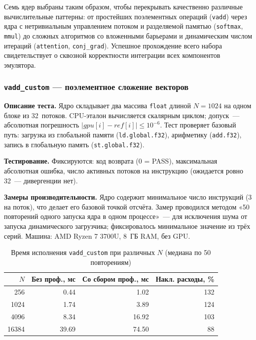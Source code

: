 Семь ядер выбраны таким образом, чтобы перекрывать качественно различные
вычислительные паттерны: от простейших поэлементных операций (\texttt{vadd})
через ядра с нетривиальным управлением потоком и разделяемой памятью
(\texttt{softmax}, \texttt{mmul}) до сложных алгоритмов со вложенными
барьерами и динамическим числом итераций (\texttt{attention}, \texttt{conj\_grad}).
Успешное прохождение всего набора свидетельствует о сквозной корректности
интеграции всех компонентов эмулятора.

\subsubsection{\texttt{vadd\_custom} --- поэлементное сложение векторов}

\textbf{Описание теста.}
Ядро складывает два массива \texttt{float} длиной $N=1024$ на одном
блоке из 32~потоков. CPU-эталон вычисляется скалярным циклом;
допуск~--- абсолютная погрешность $|gpu[i] - ref[i]| \leq 10^{-6}$.
Тест проверяет базовый путь: загрузка из глобальной памяти
(\texttt{ld.global.f32}), арифметику (\texttt{add.f32}),
запись в глобальную память (\texttt{st.global.f32}).

\textbf{Тестирование.}
Фиксируются: код возврата (0 = PASS), максимальная абсолютная
ошибка, число активных потоков на инструкцию
(ожидается ровно 32~--- дивергенции нет).

\textbf{Замеры производительности.}
Ядро содержит минимальное число инструкций (3 на поток),
что делает его базовой точкой отсчёта. Замер проводился
методом «50 повторений одного запуска ядра в одном процессе»~---
для исключения шума от запуска динамического загрузчика;
фиксировалось минимальное значение из трёх серий.
Машина: AMD Ryzen 7 3700U, 8~ГБ RAM, без GPU.

\begin{table}[h]
  \caption{Время исполнения \texttt{vadd\_custom} при различных $N$
           (медиана по 50 повторениям)}
  \label{tab:vadd_perf}
  \centering
  \begin{tabular}{rrrr}
    \toprule
    $N$ & Без проф., мс & Со сбором проф., мс & Накл. расходы, \% \\
    \midrule
    256   & 0.44 & 1.02 & 132 \\
    1024  & 1.74 & 3.89 & 124 \\
    4096  & 8.34 & 16.92 & 103 \\
    16384 & 39.69 & 74.50 & 88 \\
    \bottomrule
  \end{tabular}
\end{table}

